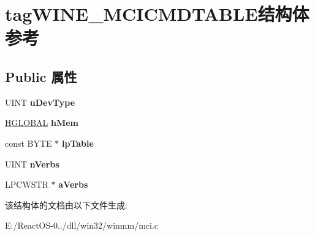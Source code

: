 \hypertarget{structtag_w_i_n_e___m_c_i_c_m_d_t_a_b_l_e}{}\section{tag\+W\+I\+N\+E\+\_\+\+M\+C\+I\+C\+M\+D\+T\+A\+B\+L\+E结构体 参考}
\label{structtag_w_i_n_e___m_c_i_c_m_d_t_a_b_l_e}
\subsection*{Public 属性}
\begin{DoxyCompactItemize}
\item 
\mbox{\label{structtag_w_i_n_e___m_c_i_c_m_d_t_a_b_l_e_a118653aa6fbbc452b36f5cd8480a0f2e}} 
U\+I\+NT {\bfseries u\+Dev\+Type}
\item 
\mbox{\label{structtag_w_i_n_e___m_c_i_c_m_d_t_a_b_l_e_a49436eedc6a64b020f0c1a6b1ad87dd0}} 
\hyperlink{interfacevoid}{H\+G\+L\+O\+B\+AL} {\bfseries h\+Mem}
\item 
\mbox{\label{structtag_w_i_n_e___m_c_i_c_m_d_t_a_b_l_e_afe38129e2a60caac5b39708fdc7a8b31}} 
const B\+Y\+TE $\ast$ {\bfseries lp\+Table}
\item 
\mbox{\label{structtag_w_i_n_e___m_c_i_c_m_d_t_a_b_l_e_a9e6c428924e7dbe7246dedd8cb9f551a}} 
U\+I\+NT {\bfseries n\+Verbs}
\item 
\mbox{\label{structtag_w_i_n_e___m_c_i_c_m_d_t_a_b_l_e_a10d9a661481430f30bd6b3cf13c8ad30}} 
L\+P\+C\+W\+S\+TR $\ast$ {\bfseries a\+Verbs}
\end{DoxyCompactItemize}


该结构体的文档由以下文件生成\+:\begin{DoxyCompactItemize}
\item 
E\+:/\+React\+O\+S-\/0../dll/win32/winmm/mci.\+c\end{DoxyCompactItemize}

